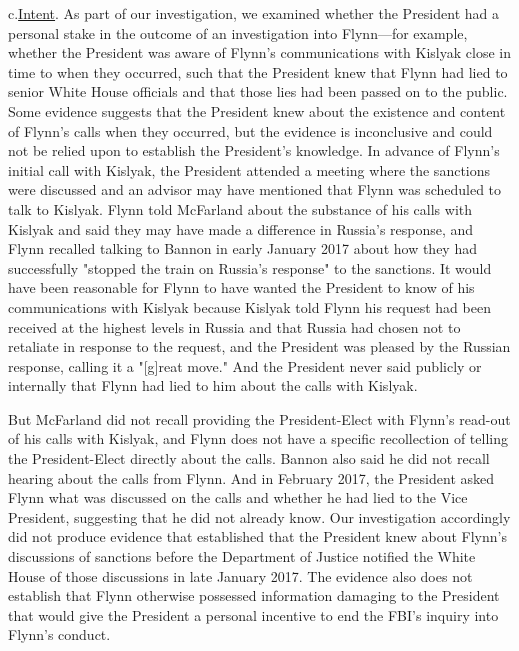 c.\qquad\underline{Intent}.
As part of our investigation, we examined whether the President had a personal stake in the outcome of an investigation into Flynn---for example, whether the President was aware of Flynn's communications with Kislyak close in time to when they occurred, such that the President knew that Flynn had lied to senior White House officials and that those lies had been passed on to the public.
Some evidence suggests that the President knew about the existence and content of Flynn's calls when they occurred, but the evidence is inconclusive and could not be relied upon to establish the President's knowledge.
In advance of Flynn's initial call with Kislyak, the President attended a meeting where the sanctions were discussed and an advisor may have mentioned that Flynn was scheduled to talk to Kislyak.
Flynn told McFarland about the substance of his calls with Kislyak and said they may have made a difference in Russia's response, and Flynn recalled talking to Bannon in early January 2017 about how they had successfully "stopped the train on Russia's response" to the sanctions.
It would have been reasonable for Flynn to have wanted the President to know of his communications with Kislyak because Kislyak told Flynn his request had been received at the highest levels in Russia and that Russia had chosen not to retaliate in response to the request, and the President was pleased by the Russian response, calling it a "[g]reat move."
And the President never said publicly or internally that Flynn had lied to him about the calls with Kislyak.

But McFarland did not recall providing the President-Elect with Flynn's read-out of his calls with Kislyak, and Flynn does not have a specific recollection of telling the President-Elect directly about the calls.
Bannon also said he did not recall hearing about the calls from Flynn.
And in February 2017, the President asked Flynn what was discussed on the calls and whether he had lied to the Vice President, suggesting that he did not already know.
Our investigation accordingly did not produce evidence that established that the President knew about Flynn's discussions of sanctions before the Department of Justice notified the White House of those discussions in late January 2017.
The evidence also does not establish that Flynn otherwise possessed information damaging to the President that would give the President a personal incentive to end the FBI's inquiry into Flynn's conduct.

